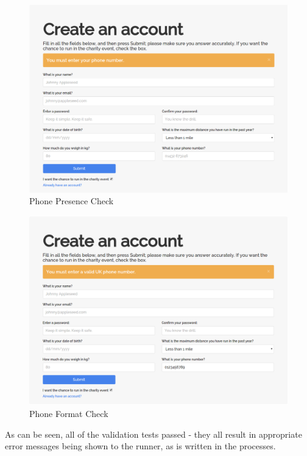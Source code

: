 \documentclass{article}[12pt,a4paper]
\begin{document}
\begin{figure}[h!]
  \includegraphics[scale=0.25]{images/testing/registration_validation/phone_presence}
  \caption{Phone Presence Check}
\end{figure}

\begin{figure}[h!]
  \includegraphics[scale=0.25]{images/testing/registration_validation/phone_format}
  \caption{Phone Format Check}
\end{figure}

As can be seen, all of the validation tests passed - they all result in appropriate error messages being shown to the runner, as is written in the processes.

\clearpage
\end{document}
